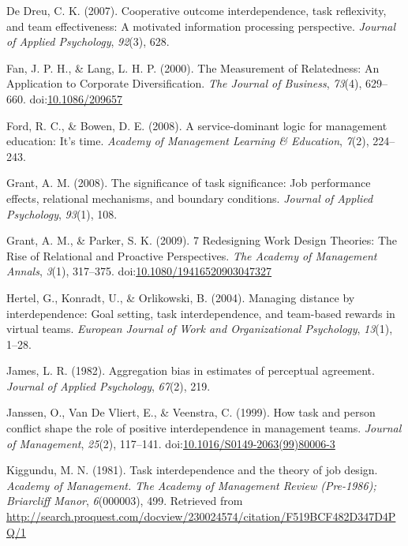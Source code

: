 \documentclass[english,,man]{apa6}
\theoremstyle{definition}
\theoremstyle{definition}
\theoremstyle{definition}
\theoremstyle{remark}
\begin{document}
\leavevmode\hypertarget{ref-de_dreu_cooperative_2007}{}%
De Dreu, C. K. (2007). Cooperative outcome interdependence, task
reflexivity, and team effectiveness: A motivated information processing
perspective. \emph{Journal of Applied Psychology}, \emph{92}(3), 628.

\leavevmode\hypertarget{ref-fan_measurement_2000}{}%
Fan, J. P. H., \& Lang, L. H. P. (2000). The Measurement of Relatedness:
An Application to Corporate Diversification. \emph{The Journal of
Business}, \emph{73}(4), 629--660.
doi:\href{https://doi.org/10.1086/209657}{10.1086/209657}

\leavevmode\hypertarget{ref-ford_service-dominant_2008}{}%
Ford, R. C., \& Bowen, D. E. (2008). A service-dominant logic for
management education: It's time. \emph{Academy of Management Learning \&
Education}, \emph{7}(2), 224--243.

\leavevmode\hypertarget{ref-grant_significance_2008}{}%
Grant, A. M. (2008). The significance of task significance: Job
performance effects, relational mechanisms, and boundary conditions.
\emph{Journal of Applied Psychology}, \emph{93}(1), 108.

\leavevmode\hypertarget{ref-grant_7_2009}{}%
Grant, A. M., \& Parker, S. K. (2009). 7 Redesigning Work Design
Theories: The Rise of Relational and Proactive Perspectives. \emph{The
Academy of Management Annals}, \emph{3}(1), 317--375.
doi:\href{https://doi.org/10.1080/19416520903047327}{10.1080/19416520903047327}

\leavevmode\hypertarget{ref-hertel_managing_2004}{}%
Hertel, G., Konradt, U., \& Orlikowski, B. (2004). Managing distance by
interdependence: Goal setting, task interdependence, and team-based
rewards in virtual teams. \emph{European Journal of Work and
Organizational Psychology}, \emph{13}(1), 1--28.

\leavevmode\hypertarget{ref-james_aggregation_1982}{}%
James, L. R. (1982). Aggregation bias in estimates of perceptual
agreement. \emph{Journal of Applied Psychology}, \emph{67}(2), 219.

\leavevmode\hypertarget{ref-janssen_how_1999}{}%
Janssen, O., Van De Vliert, E., \& Veenstra, C. (1999). How task and
person conflict shape the role of positive interdependence in management
teams. \emph{Journal of Management}, \emph{25}(2), 117--141.
doi:\href{https://doi.org/10.1016/S0149-2063(99)80006-3}{10.1016/S0149-2063(99)80006-3}

\leavevmode\hypertarget{ref-kiggundu_task_1981}{}%
Kiggundu, M. N. (1981). Task interdependence and the theory of job
design. \emph{Academy of Management. The Academy of Management Review
(Pre-1986); Briarcliff Manor}, \emph{6}(000003), 499. Retrieved from
\url{http://search.proquest.com/docview/230024574/citation/F519BCF482D347D4PQ/1}
\end{document}
